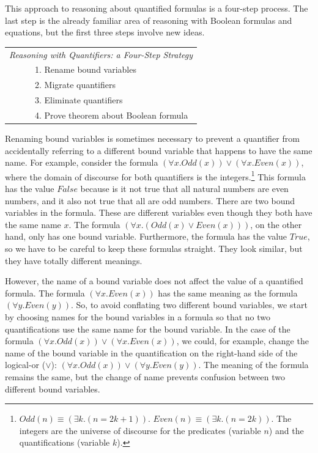 {{This approach to reasoning about quantified formulas is a four-step process.
The last step is the already familiar area of reasoning
with Boolean formulas and equations,
but the first three steps involve new ideas.

\begin{center}
\begin{tabular} {l}
\emph{Reasoning with Quantifiers: a Four-Step Strategy} \\
~~~~~~1. Rename bound variables \\
~~~~~~2. Migrate quantifiers \\
~~~~~~3. Eliminate quantifiers \\
~~~~~~4. Prove theorem about Boolean formula \\
\end{tabular}
\label{four-step-strategy-quantifiers}
\end{center}

Renaming bound variables is sometimes necessary to prevent
a quantifier from accidentally referring to a different bound variable
that happens to have the same name.
For example, consider the formula
$(\forall x.Odd(x)) \vee (\forall x.Even(x))$,
where the domain of discourse for both quantifiers is the integers.\footnote{$Odd(n) \equiv (\exists k.(n = 2k+1))$.
\label{even-number-predicate-Even}
$Even(n) \equiv (\exists k.(n = 2k))$.
The integers are the universe of discourse for the predicates (variable $n$)
and the quantifications (variable $k$).}
This formula has the value $False$ because is it not true
that all natural numbers are even numbers,
and it also not true that all are odd numbers.
There are two bound variables in the formula.
These are different variables even though they both have
the same name $x$.
The formula $(\forall x.(Odd(x) \vee Even(x)))$, on the other hand,
only has one bound variable.
Furthermore, the formula has the value $True$,
so we have to be careful to keep these formulas straight.
They look similar, but they have totally different meanings.

However, the name of a bound variable does not affect the value
of a quantified formula.
The formula $(\forall x.Even(x))$ has the same meaning
as the formula $(\forall y.Even(y))$.
So, to avoid conflating two different bound variables,
we start by choosing names for the bound variables in a formula
so that no two quantifications use the same name for the bound variable.
In the case of the formula
$(\forall x.Odd(x)) \vee (\forall x.Even(x))$,
we could, for example, change the name of the bound variable
in the quantification on the right-hand side of the logical-or ($\vee$):
$(\forall x.Odd(x)) \vee (\forall y.Even(y))$.
The meaning of the formula remains the same,
but the change of name prevents confusion between two different bound variables.

}}
